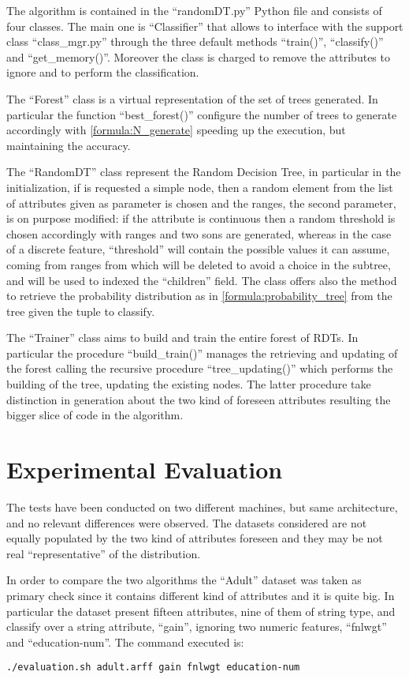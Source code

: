 \documentclass{acm_proc_article-sp-sigmod07}
\begin{document}
The algorithm is contained in the ``randomDT.py'' Python file and consists
of four classes. The main one is ``Classifier'' that allows to interface
with the support class ``class\_mgr.py'' through the three default methods
``train()'', ``classify()'' and ``get\_memory()''. Moreover the class is
charged to remove the attributes to ignore and to perform the
classification.

The ``Forest'' class is a virtual representation of the set of trees
generated. In particular the function ``best\_forest()'' configure the
number of trees to generate accordingly with \ref{formula:N_generate}
speeding up the execution, but maintaining the accuracy.

The ``RandomDT'' class represent the Random Decision Tree, in particular
in the initialization, if is requested a simple node, then a random
element from the list of attributes given as parameter is chosen and the
ranges, the second parameter, is on purpose modified: if the attribute is
continuous then a random threshold is chosen accordingly with
ranges and two sons are generated, whereas in the case of a discrete
feature, ``threshold'' will contain the possible values it can
assume, coming from ranges from which will be deleted to avoid a choice
in the subtree, and will be used to indexed the ``children'' field.
The class offers also the method to retrieve the probability distribution
as in \ref{formula:probability_tree} from the tree given the tuple to
classify.

The ``Trainer'' class aims to build and train the entire forest of RDTs.
In particular the procedure ``build\_train()'' manages the retrieving and
updating of the forest calling the recursive procedure
``tree\_updating()'' which performs the building of the tree, updating the
existing nodes. The latter procedure take distinction in generation about
the two kind of foreseen attributes resulting the bigger slice of code in
the algorithm.

\section{Experimental Evaluation}
The tests have been conducted on two different machines, but same
architecture, and no relevant differences were observed. The datasets
considered are not equally populated by the two kind of attributes
foreseen and they may be not real ``representative'' of the distribution.

In order to compare the two algorithms the ``Adult'' dataset was taken as
primary check since it contains different kind of attributes and it is
quite big. In particular the dataset present fifteen attributes, nine of
them of string type, and classify over a string attribute, ``gain'',
ignoring two numeric features, ``fnlwgt'' and ``education-num''. The
command executed is:
\begin{verbatim}
./evaluation.sh adult.arff gain fnlwgt education-num
\end{verbatim}
\end{document}
